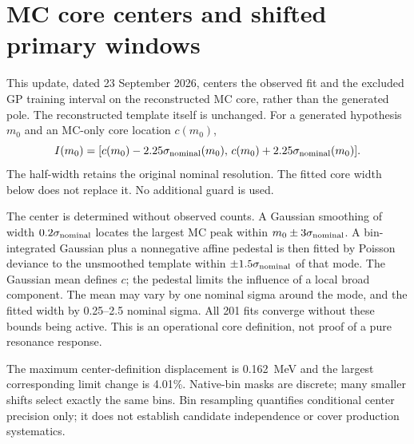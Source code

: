 \clearpage
\section{MC core centers and shifted primary windows}
\label{sec:corecenter}
This update, dated 23 September 2026, centers the observed fit and the
excluded GP training interval on the reconstructed MC core, rather than
the generated pole. The reconstructed template itself is unchanged.
For a generated hypothesis $m_0$ and an MC-only core location $c(m_0)$,
\begin{equation}
 I(m_0)=[c(m_0)-2.25\sigma_{\rm nominal}(m_0),\,
         c(m_0)+2.25\sigma_{\rm nominal}(m_0)].
\end{equation}
The half-width retains the original nominal resolution. The fitted core
width below does not replace it. No additional guard is used.

The center is determined without observed counts. A Gaussian smoothing
of width $0.2\sigma_{\rm nominal}$ locates the largest MC peak within
$m_0\pm3\sigma_{\rm nominal}$. A bin-integrated Gaussian plus a
nonnegative affine pedestal is then fitted by Poisson deviance to the
unsmoothed template within $\pm1.5\sigma_{\rm nominal}$ of that mode.
The Gaussian mean defines $c$; the pedestal limits the influence of a
local broad component. The mean may vary by one nominal sigma around
the mode, and the fitted width by 0.25--2.5 nominal sigma. All 201 fits
converge without these bounds being active. This is an operational core
definition, not proof of a pure resonance response.

\begin{table}[H]\centering\scriptsize

\caption{Native-MC core centers and stability. All mass quantities are
in MeV. MC spread is the standard deviation of the estimated center
under 32 independent-bin Poisson resamples. The last two columns vary
the core-fit half-width from its default 1.5 nominal sigma to 1.25 and
2.0, and refit the observed MC limit using each alternative center.}
\end{table}

The maximum center-definition displacement is 0.162~MeV and the largest
corresponding limit change is 4.01\%. Native-bin masks are discrete;
many smaller shifts select exactly the same bins. Bin resampling
quantifies conditional center precision only; it does not establish
candidate independence or cover production systematics.



